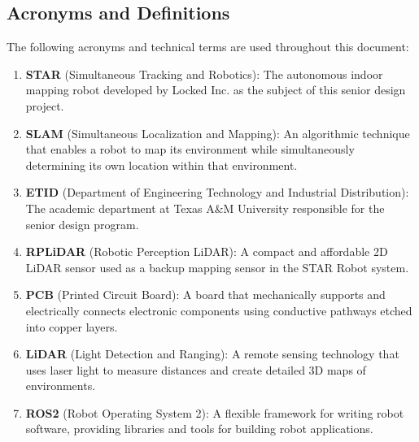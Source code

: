 
\subsection{Acronyms and Definitions}\label{sec:acronyms}

The following acronyms and technical terms are used throughout this document:

\begin{enumerate}
    \item \label{acr:STAR} \textbf{STAR} (Simultaneous Tracking and Robotics): The autonomous indoor mapping robot developed by Locked Inc. as the subject of this senior design project.

    \item \label{acr:SLAM} \textbf{SLAM} (Simultaneous Localization and Mapping): An algorithmic technique that enables a robot to map its environment while simultaneously determining its own location within that environment.

    \item \label{acr:ETID} \textbf{ETID} (Department of Engineering Technology and Industrial Distribution): The academic department at Texas A\&M University responsible for the senior design program.

    \item \label{acr:RPLiDAR} \textbf{RPLiDAR} (Robotic Perception LiDAR): A compact and affordable 2D LiDAR sensor used as a backup mapping sensor in the STAR Robot system.

    \item \label{acr:PCB} \textbf{PCB} (Printed Circuit Board): A board that mechanically supports and electrically connects electronic components using conductive pathways etched into copper layers.

    \item \label{acr:LiDAR} \textbf{LiDAR} (Light Detection and Ranging): A remote sensing technology that uses laser light to measure distances and create detailed 3D maps of environments.

    \item \label{acr:ROS2} \textbf{ROS2} (Robot Operating System 2): A flexible framework for writing robot software, providing libraries and tools for building robot applications.


\end{enumerate}
